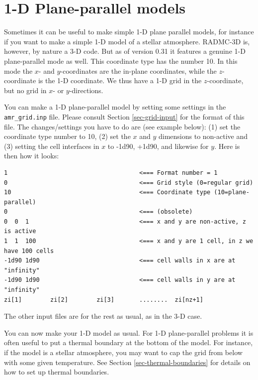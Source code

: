 \documentclass{report}
\newenvironment{asciibox}%
  {\begin{list}{}{%
    \setlength{\topsep}{0.5em}%
    \setlength{\parskip}{0em}%
    \setlength{\parsep}{0em}%
    \setlength{\itemsep}{0em}%
    \setlength{\rightmargin}{0em}%
    \setlength{\leftmargin}{3.0em}%
    \setlength{\labelsep}{1em}%
    \setlength{\labelwidth}{2em}%
  }\normalfont\footnotesize\item}
  {\end{list}}
\begin{document}
\section{1-D Plane-parallel models}
\label{sec-1d-plane-parallel}
%
Sometimes it can be useful to make simple 1-D plane parallel models, for
instance if you want to make a simple 1-D model of a stellar atmosphere.
RADMC-3D is, however, by nature a 3-D code. But as of version 0.31 it
features a genuine 1-D plane-parallel mode as well. This coordinate type has
the number 10. In this mode the $x$- and $y$-coordinates are the in-plane
coordinates, while the $z$-coordinate is the 1-D coordinate.  We thus have a
1-D grid in the $z$-coordinate, but no grid in $x$- or $y$-directions.

You can make a 1-D plane-parallel model by setting some settings in the
{\small\tt amr\_grid.inp} file. Please consult Section \ref{sec-grid-input}
for the format of this file. The changes/settings you have to do are (see
example below): (1) set the coordinate type number to 10, (2) set the $x$
and $y$ dimensions to non-active and (3) setting the cell interfaces in $x$
to -1d90, +1d90, and likewise for $y$. Here is then how it looks:
\begin{asciibox}\begin{verbatim}
1                                     <=== Format number = 1
0                                     <=== Grid style (0=regular grid)
10                                    <=== Coordinate type (10=plane-parallel)
0                                     <=== (obsolete)
0  0  1                               <=== x and y are non-active, z is active
1  1  100                             <=== x and y are 1 cell, in z we have 100 cells
-1d90 1d90                            <=== cell walls in x are at "infinity"
-1d90 1d90                            <=== cell walls in y are at "infinity"
zi[1]        zi[2]        zi[3]       ........  zi[nz+1]
\end{verbatim}\end{asciibox}
The other input files are for the rest as usual, as in the 3-D case.

You can now make your 1-D model as usual. For 1-D plane-parallel problems it
is often useful to put a thermal boundary at the bottom of the model.  For
instance, if the model is a stellar atmosphere, you may want to cap the grid
from below with some given temperature. See Section
\ref{sec-thermal-boundaries} for details on how to set up thermal
boundaries.
\end{document}
